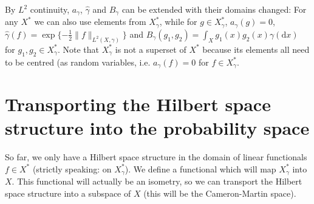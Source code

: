 \documentclass{scrartcl}
\theoremstyle{definition}
\theoremstyle{remark}
\newcommand{\de}{\mathrm d}
\begin{document}
By $L^2$ continuity, $a_\gamma$, $\hat \gamma$ and $B_\gamma$ can be extended with their domains changed: For any $X^*$ we can also use elements from $X_\gamma^*$, while for $g\in X_\gamma^*$, $a_\gamma(g) = 0$, $\hat \gamma(f) = \exp\{-\frac{1}{2}\|f\|_{L^2(X,\gamma)}\}$ and $B_\gamma(g_1, g_2) = \int_X g_1(x)g_2(x)\gamma(\de x)$ for $g_1,g_2\in X_\gamma^*$. Note that $X_\gamma^*$ is not a superset of $X^*$ because its elements all need to be centred (as random variables, i.e. $a_\gamma(f) = 0$ for $f\in X_\gamma^*$.

\section{Transporting the Hilbert space structure into the probability space}\label{sec:CM}
So far, we only have a Hilbert space structure in the domain of linear functionals $f\in X^*$ (strictly speaking: on $X_\gamma^*$). We define a functional which will map $X_\gamma^*$ into $X$. This functional will actually be an isometry, so we can transport the Hilbert space structure into a subspace of $X$ (this will be the Cameron-Martin space).
\end{document}
